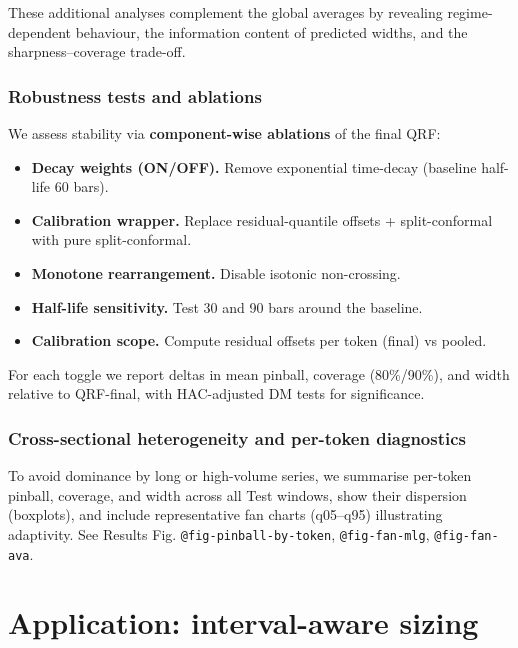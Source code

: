 \documentclass[
  a4paper,
  DIV=11,
  numbers=noendperiod]{scrreprt}
\providecommand{\tightlist}{%
  \setlength{\itemsep}{0pt}\setlength{\parskip}{0pt}}
\begin{document}
These additional analyses complement the global averages by revealing
regime-dependent behaviour, the information content of predicted widths,
and the sharpness--coverage trade-off.

\subsubsection{Robustness tests and
ablations}\label{robustness-tests-and-ablations}

We assess stability via \textbf{component-wise ablations} of the final
QRF:

\begin{itemize}
\tightlist
\item
  \textbf{Decay weights (ON/OFF).} Remove exponential time-decay
  (baseline half-life 60 bars).
\item
  \textbf{Calibration wrapper.} Replace residual-quantile offsets +
  split-conformal with pure split-conformal.
\item
  \textbf{Monotone rearrangement.} Disable isotonic non-crossing.
\item
  \textbf{Half-life sensitivity.} Test 30 and 90 bars around the
  baseline.
\item
  \textbf{Calibration scope.} Compute residual offsets per token (final)
  vs pooled.
\end{itemize}

For each toggle we report deltas in mean pinball, coverage (80\%/90\%),
and width relative to QRF-final, with HAC-adjusted DM tests for
significance.

\subsubsection{Cross-sectional heterogeneity and per-token
diagnostics}\label{cross-sectional-heterogeneity-and-per-token-diagnostics}

To avoid dominance by long or high-volume series, we summarise per-token
pinball, coverage, and width across all Test windows, show their
dispersion (boxplots), and include representative fan charts (q05--q95)
illustrating adaptivity. See Results Fig.
\texttt{@fig-pinball-by-token}, \texttt{@fig-fan-mlg},
\texttt{@fig-fan-ava}.

\section{Application: interval-aware
sizing}\label{application-interval-aware-sizing}
\end{document}
